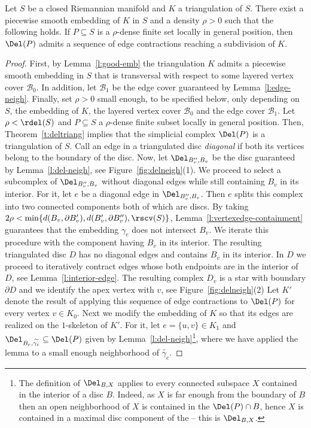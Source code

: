 %
\begin{proposition}
\label{p:refinement}
    Let $S$ be a closed Riemannian manifold and $K$ a triangulation of $S$. There exist a piecewise smooth embedding of $K$ in $S$ and a density $\rho>0$ such that the following holds. If $P\subseteq S$ is a $\rho$-dense finite set locally in general position, then $\Del(P)$ admits a sequence of edge contractions reaching a subdivision of $K$.
\end{proposition}
\begin{proof}
    First, by Lemma~\ref{l:good-emb} the triangulation $K$ admits a piecewise smooth embedding in $S$ that is transversal with respect to some layered vertex cover $\mathcal{B}_0$. In addition, let $\mathcal{B}_1$ be the edge cover guaranteed by Lemma~\ref{l:edge-neigh}.
    Finally, set $\rho >0$ small enough, to be specified below, only depending on $S$, the embedding of $K$, the layered vertex cover $\mathcal{B}_0$ and the edge cover $\mathcal{B}_1$.
%
    Let $\rho < \rdel(S)$ and $P\subseteq S$ a $\rho$-dense finite subset locally in general position. Then, Theorem~\ref{t:deltriang} implies that the simplicial complex $\Del(P)$ is a triangulation of $S$.
%
    Call an edge in a triangulated disc \emph{diagonal} if both its vertices belong to the boundary of the disc.
    Now, let $\Del_{B''_v,B_v}$ be the disc guaranteed by Lemma~\ref{l:del-neigh}, see Figure~\ref{fig:delneigh}(1). We proceed to select a subcomplex of $\Del_{B''_v,B_v}$ without diagonal edges while still containing $B_v$ in its interior. For it, let $e$ be a diagonal edge in $\Del_{B''_v,B_v}$. Then $e$ splits this complex into two connected components both of which are 
discs. 
    By taking $2\rho < \min \{d(B_v,\partial B_v'), d(B_v',\partial B_v''), \rscv(S)\}$, Lemma~\ref{l:vertexedge-containment} guarantees that the embedding $\gamma_e$ does not intersect $B_v$. We iterate this procedure with the component having $B_v$ in its interior. The resulting triangulated disc $D$ has no diagonal edges and contains $B_v$ in its interior.
    In $D$ we proceed to iteratively contract edges whose both endpoints are in the interior of $D$, see Lemma~\ref{l:interior-edge}. The resulting complex $D_v$ is a star with boundary $\partial D$ and we identify the apex vertex with $v$, see Figure~\ref{fig:delneigh}(2) Let $K'$ denote the result of applying this sequence of edge contractions to $\Del(P)$ for every vertex $v\in K_0$.
%
%
    Next we modify the embedding of $K$ 
    so that its edges are realized on the $1$-skeleton of $K'$.
    For it, let $e=\{u,v\}\in K_1$ and $\Del_{B_e,\widetilde{\gamma_e}} \subseteq \Del(P)$ given by Lemma~\ref{l:del-neigh}\footnote{The definition of $\Del_{B,X}$ applies to every connected subspace $X$ contained in the interior of a disc $B$. Indeed, as $X$ is far enough from the boundary of $B$ then an open neighborhood of $X$ is contained in the  $\Del(P)\cap B$, hence $X$ is contained in a maximal disc component of the  -- this is $\Del_{B,X}$.}, where we have applied the lemma to a small enough neighborhood of $\widetilde{\gamma_e}$. 

\end{proof}
